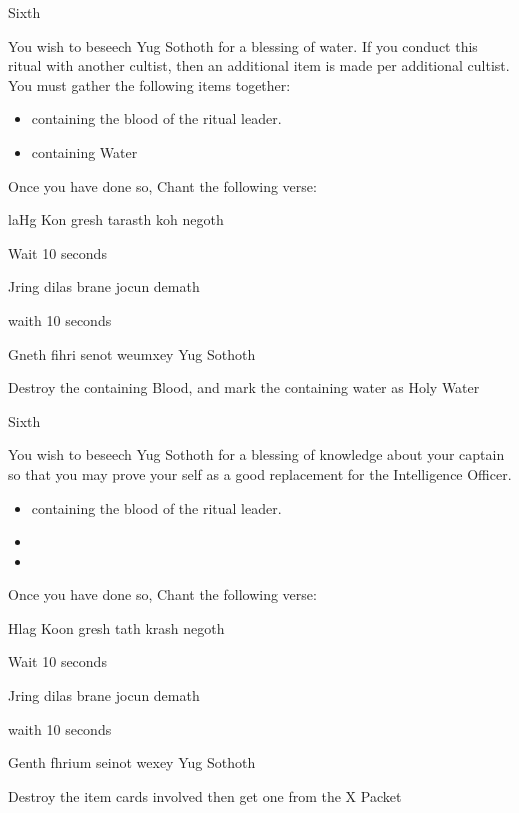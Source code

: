 \documentclass[greennotebook]{guildcamp4} %
\begin{document}
\begin{page}{Sixth}
	
		You wish to beseech Yug Sothoth for a blessing of water. If you conduct this ritual with another cultist, then an additional item is made per additional cultist. You must gather the following items together: 
		
		\begin{itemize}
			\item \iTestTube{} containing the blood of the ritual leader.
			\item \iTestTube{} containing Water
		\end{itemize}
		
		Once you have done so, Chant the following verse:
		
		laHg Kon gresh tarasth koh negoth
		
		Wait 10 seconds
		
		Jring dilas brane jocun demath
		
		waith 10 seconds
		
		Gneth fihri senot weumxey Yug Sothoth
		
		Destroy the \iTestTube{} containing Blood, and mark the \iTestTube{} containing water as Holy Water
		
	
\end{page}

\begin{page}{Sixth}
	

	You wish to beseech Yug Sothoth for a blessing of knowledge about your captain so that you may prove your self as a good replacement for the Intelligence Officer.  
		
	\begin{itemize}
			\item \iTestTube{} containing the blood of the ritual leader.
			\item \iGlassLens{}
			\item \iScrapMetal{}
	\end{itemize}
	
	Once you have done so, Chant the following verse:
		
	Hlag Koon gresh tath krash negoth
	
	Wait 10 seconds
	
	Jring dilas brane jocun demath
	
	waith 10 seconds
	
	Genth fhrium seinot wexey Yug Sothoth	
	
	Destroy the item cards involved then get one \iBlackMailD{} from the X Packet
	
	
\end{page}


\endnotebook
\end{document}

